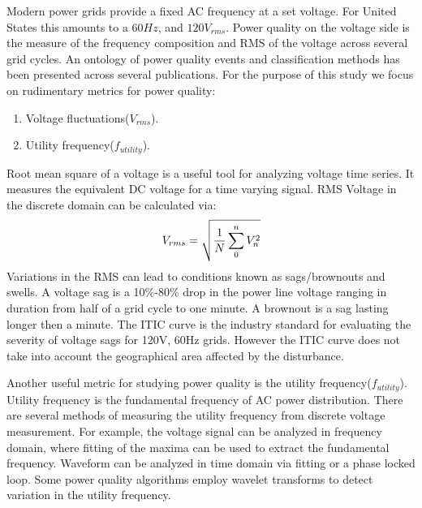 Modern power grids provide a fixed AC frequency at a set voltage. For United States this amounts to a $60Hz$, and $120V_{rms}$. Power quality on the voltage side is the  measure of the frequency composition and RMS of the voltage across several grid cycles. An ontology of power quality events and classification methods has been presented across several publications.\cite{pq_onto1} \cite{pq_class} For the purpose of this study we focus on rudimentary metrics for power quality:

\begin{enumerate}
\item Voltage fluctuations($V_{rms}$).
\item Utility frequency($f_{utility}$).
\end{enumerate}

Root mean square of a voltage is a useful tool for analyzing voltage time series. It measures the equivalent DC voltage for a time varying signal. RMS Voltage in the discrete domain can be calculated via:
\begin{equation}
\label{eq:rms}
\centering
V_{rms} = \sqrt{\frac{1}{N} \sum_{0}^{n}{V_{n}^2}}
\end{equation}
Variations in the RMS can lead to conditions known as sags/brownouts and swells. A voltage sag is a 10\%-80\% drop in the power line voltage ranging in duration from half of a grid cycle to one minute. A brownout is a sag lasting longer then a minute. The ITIC curve is the industry standard for evaluating the severity of voltage sags for 120V, 60Hz grids. However the ITIC curve does not take into account the geographical area affected by the disturbance.

Another useful metric for studying power quality is the utility frequency($f_{utility}$). Utility frequency is the fundamental frequency of AC power distribution. There are several methods of measuring the utility frequency from discrete voltage measurement. For example, the voltage signal can be analyzed in frequency domain, where fitting of the maxima can be used to extract the fundamental frequency. Waveform can be analyzed in time domain via fitting or a phase locked loop. Some power quality algorithms employ wavelet transforms to detect variation in the utility frequency.\cite{pq_class}

